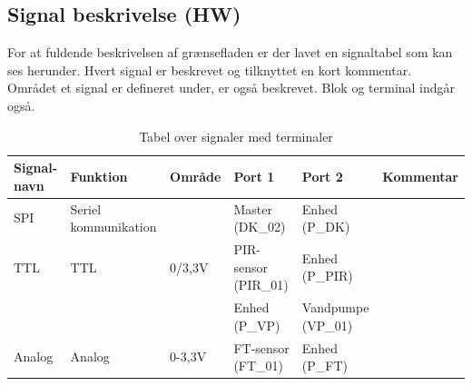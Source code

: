 \begin{table}[H]
\subsection{Signal beskrivelse (HW)}
For at fuldende beskrivelsen af grænsefladen er der lavet en signaltabel som kan ses herunder. Hvert signal er beskrevet og tilknyttet en kort kommentar. Området et signal er defineret under, er også beskrevet. Blok og terminal indgår også. 
\caption{Tabel over signaler med terminaler}
\begin{small}
\begin{tabular}{|p{2cm}|p{2cm}|p{2cm}|p{2cm}|p{2cm}|p{}|}
\hline

\textbf{Signal-navn}	&\textbf{Funktion} 		&\textbf{Område} &\textbf{Port 1} 	&\textbf{Port 2} 			&\textbf{Kommentar} \\ \hline

SPI 					&Seriel kommunikation 	& 				&Master (DK\_02)		&Enhed (P\_DK)				&					 \\\hline

TTL 					&TTL 					&0\slash3,3V 	&PIR-sensor (PIR\_01) &Enhed (P\_PIR)			&					\\\cline{4-5}
					&						&				&Enhed (P\_VP)		&Vandpumpe (VP\_01)			&					\\\hline
					
Analog				&Analog 					&0-3,3V 			&FT-sensor (FT\_01) &Enhed (P\_FT)			&	    				\\\hline

\end{tabular}
\end{small}
\label{table:Signaltabel}
\end{table}
